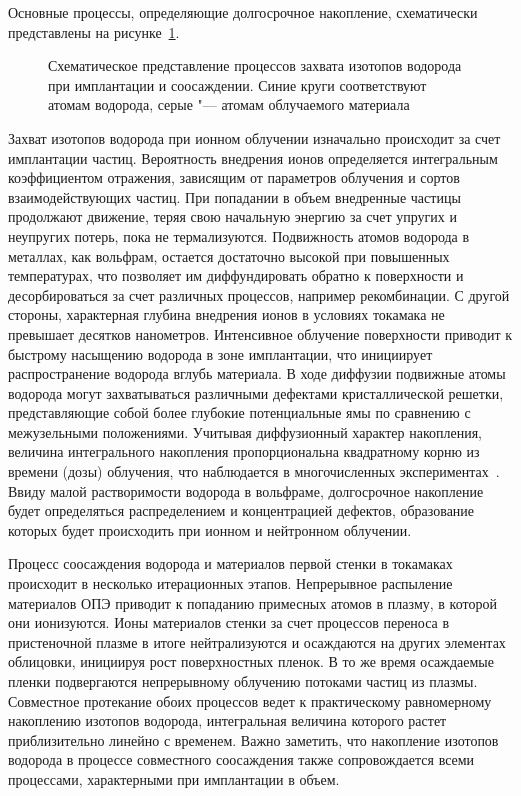 Основные процессы, определяющие долгосрочное накопление, схематически представлены на рисунке~\cref{fig:ch1/retention_mechanisms}.
\begin{figure}[ht]
    \caption{Схематическое представление процессов захвата изотопов водорода при имплантации и соосаждении. Синие круги соответствуют атомам водорода, серые "--- атомам облучаемого материала}\label{fig:ch1/retention_mechanisms}
\end{figure}
Захват изотопов водорода при ионном облучении изначально происходит за счет имплантации частиц. Вероятность внедрения ионов определяется интегральным коэффициентом отражения, зависящим от параметров облучения и сортов взаимодействующих частиц. При попадании в объем внедренные частицы продолжают движение, теряя свою начальную энергию за счет упругих и неупругих потерь, пока не термализуются. Подвижность атомов водорода в металлах, как вольфрам, остается достаточно высокой при повышенных температурах, что позволяет им диффундировать обратно к поверхности и десорбироваться за счет различных процессов, например рекомбинации. С другой стороны, характерная глубина внедрения ионов в условиях токамака не превышает десятков нанометров. Интенсивное облучение поверхности приводит к быстрому насыщению водорода в зоне имплантации, что инициирует распространение водорода вглубь материала. В ходе диффузии подвижные атомы водорода могут захватываться различными дефектами кристаллической решетки, представляющие собой более глубокие потенциальные ямы по сравнению с межузельными положениями. Учитывая диффузионный характер накопления, величина интегрального накопления пропорциональна квадратному корню из времени (дозы) облучения, что наблюдается в многочисленных экспериментах~\cite{Ogorodnikova2003,Ogorodnikova2009,Sugiyama2014,Zhang2020}. Ввиду малой растворимости водорода в вольфраме, долгосрочное накопление будет определяться распределением и концентрацией дефектов, образование которых будет происходить при ионном и нейтронном облучении.

Процесс соосаждения водорода и материалов первой стенки в токамаках происходит в несколько итерационных этапов. Непрерывное распыление материалов ОПЭ приводит к попаданию примесных атомов в плазму, в которой они ионизуются. Ионы материалов стенки за счет процессов переноса в пристеночной плазме в итоге нейтрализуются и осаждаются на других элементах облицовки, инициируя рост поверхностных пленок. В то же время осаждаемые пленки подвергаются непрерывному облучению потоками частиц из плазмы. Совместное протекание обоих процессов ведет к практическому равномерному накоплению изотопов водорода, интегральная величина которого растет приблизительно линейно с временем. Важно заметить, что накопление изотопов водорода в процессе совместного соосаждения также сопровождается всеми процессами, характерными при имплантации в объем.

